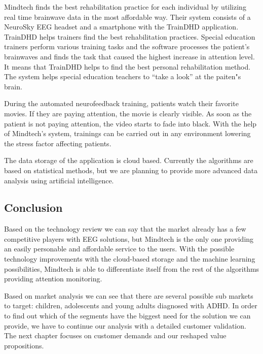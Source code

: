 \documentclass[letterpaper,10pt]{article}
\let\oldsubsection\subsection
\renewcommand{\subsection}{\def\cursectioning{subsection}\oldsubsection}
\begin{document}
Mindtech finds the best rehabilitation practice for each individual by utilizing real time brainwave data in the most affordable way. Their system consists of a NeuroSky EEG headset and a smartphone with the TrainDHD application. TrainDHD helps trainers find the best rehabilitation practices. Special education trainers perform various training tasks and the software processes the patient's brainwaves and finds the task that caused the highest increase in attention level. It means that TrainDHD helps to find the best personal rehabilitation method. The system helps special education teachers to “take a look” at the paiten"s brain.

During the automated neurofeedback training, patients watch their favorite movies. If they are paying attention, the movie is clearly visible. As soon as the patient is not paying attention, the video starts to fade into black. With the help of Mindtech's system, trainings can be carried out in any environment lowering the stress factor affecting patients.

The data storage of the application is cloud based. Currently the algorithms are based on statistical methods, but we are planning to provide more advanced data analysis using artificial intelligence. \cite{mindtech}

\newpage
\subsection{Conclusion}


Based on the technology review we can say that the market already has a few competitive players with EEG solutions, but Mindtech is the only one providing an easily personable and affordable service to the users. With the possible technology improvements with the cloud-based storage and the machine learning possibilities, Mindtech is able to differentiate itself from the rest of the algorithms providing attention monitoring.


Based on market analysis we can see that there are several possible sub markets to target: children, adolescents and young adults diagnosed with ADHD. In order to find out which of the segments have the biggest need for the solution we can provide, we have to continue our analysis with a detailed customer validation. The next chapter focuses on customer demands and our reshaped value propositions.


\newpage


\end{document}
